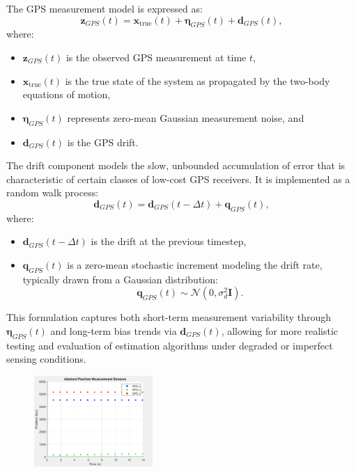 The GPS measurement model is expressed as:
\begin{equation}
    \mathbf{z}_{GPS}(t) = \mathbf{x}_{\text{true}}(t) + \boldsymbol{\eta}_{GPS}(t) + \mathbf{d}_{GPS}(t),
\end{equation}
where:
\begin{itemize}
    \item $\mathbf{z}_{GPS}(t)$ is the observed GPS measurement at time $t$,
    \item $\mathbf{x}_{\text{true}}(t)$ is the true state of the system as propagated by the two-body equations of motion,
    \item $\boldsymbol{\eta}_{GPS}(t)$ represents zero-mean Gaussian measurement noise, and
    \item $\mathbf{d}_{GPS}(t)$ is the GPS drift.
\end{itemize}

The drift component models the slow, unbounded accumulation of error that is characteristic of certain classes of low-cost GPS receivers. It is implemented as a random walk process:
\begin{equation}
    \mathbf{d}_{GPS}(t) = \mathbf{d}_{GPS}(t - \Delta t) + \mathbf{q}_{GPS}(t),
\end{equation}
where:
\begin{itemize}
    \item $\mathbf{d}_{GPS}(t - \Delta t)$ is the drift at the previous timestep,
    \item $\mathbf{q}_{GPS}(t)$ is a zero-mean stochastic increment modeling the drift rate, typically drawn from a Gaussian distribution:
    \begin{equation}
        \mathbf{q}_{GPS}(t) \sim \mathcal{N}(0, \sigma_d^2 \mathbf{I}).
    \end{equation}
\end{itemize}

This formulation captures both short-term measurement variability through $\boldsymbol{\eta}_{GPS}(t)$ and long-term bias trends via $\mathbf{d}_{GPS}(t)$, allowing for more realistic testing and evaluation of estimation algorithms under degraded or imperfect sensing conditions.


\begin{figure}[H]
    \centering
    \includegraphics[width=0.4\textwidth]{figures/modelling/GPSMeasurement.png}
    \caption{}
    \label{fig:GPS}
\end{figure}



